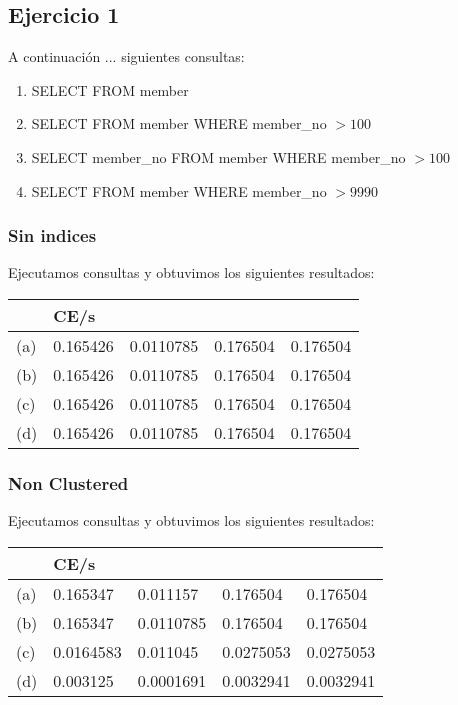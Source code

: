 \subsection{Ejercicio 1}

A continuación ... siguientes consultas:
\begin{enumerate}[label=(\alph*)]
\item{SELECT \* FROM member}

\item{SELECT \* FROM member WHERE member\_no $> 100$}

\item{SELECT member\_no FROM member WHERE member\_no $> 100$}

\item{SELECT FROM member WHERE member\_no $> 9990$}

\end{enumerate}

\subsubsection{Sin indices}	

Ejecutamos consultas y obtuvimos los siguientes resultados: \\

\begin{tabular}{| L | L | L | L | L |}
    \hline
     & CE/s &  &  &  \\ \hline
	(a) & 0.165426 & 0.0110785 & 0.176504 & 0.176504 \\ \hline
	(b) & 0.165426 & 0.0110785 & 0.176504 &	0.176504 \\ \hline
	(c) & 0.165426 & 0.0110785 & 0.176504 &	0.176504 \\ \hline
	(d) & 0.165426 & 0.0110785 & 0.176504 &	0.176504 \\ \hline
\end{tabular}


\subsubsection{Non Clustered}

Ejecutamos consultas y obtuvimos los siguientes resultados:

\begin{tabular}{| L | L | L | L | L |}
    \hline
     & CE/s &  &  &  \\ \hline
    (a) & 0.165347 & 0.011157 & 0.176504 & 0.176504 \\ \hline
    (b) & 0.165347 & 0.0110785 & 0.176504 & 0.176504 \\ \hline
    (c) & 0.0164583 & 0.011045 & 0.0275053 & 0.0275053 \\ \hline
    (d) & 0.003125 & 0.0001691 & 0.0032941 & 0.0032941 \\ \hline    
\end{tabular}
	

